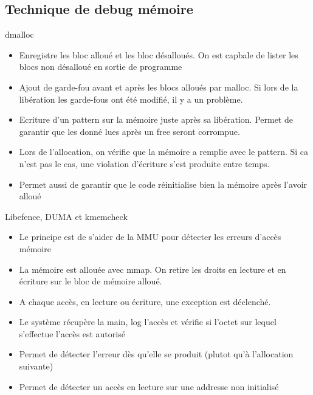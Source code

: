 \subsection{Technique de debug mémoire}

\begin{frame}[fragile=singleslide]{dmalloc}
  \begin{itemize}
  \item  Enregistre les  bloc alloué  et les  bloc désalloués.  On est
    capbale de lister les blocs non désalloué en sortie de programme
  \item  Ajout de  garde-fou  avant  et après  les  blocs alloués  par
    malloc. Si lors  de la libération les garde-fous  ont été modifié,
    il y a un problème.
  \item  Ecriture   d'un  pattern  sur  la  mémoire   juste  après  sa
    libération. Permet  de garantir que  les donné lues après  un free
    seront corrompue.
  \item Lors de l'allocation, on vérifie que la mémoire a remplie avec
    le pattern. Si ca n'est pas le cas, une violation d'écriture s'est
    produite entre temps.
  \item  Permet aussi  de garantir  que le  code réinitialise  bien la
    mémoire après l'avoir alloué
  \end{itemize} 
\end{frame} 

\begin{frame}[fragile=singleslide]{Libefence, DUMA et kmemcheck}
  \begin{itemize} 
  \item Le principe est de s'aider de la MMU pour détecter les erreurs
    d'accès mémoire
  \item  La mémoire est  allouée avec  mmap. On  retire les  droits en
    lecture et en écriture sur le bloc de mémoire alloué.
  \item  A chaque  accès, en  lecture ou  écriture, une  exception est
    déclenché.
  \item Le système récupère la main, log l'accès et vérifie si l'octet
    sur lequel s'effectue l'accès est autorisé
  \item  Permet de détecter  l'erreur dès  qu'elle se  produit (plutot
    qu'à l'allocation suivante)
  \item Permet  de détecter un accès  en lecture sur  une addresse non
    initialisé
  \end{itemize}
\end{frame} 

